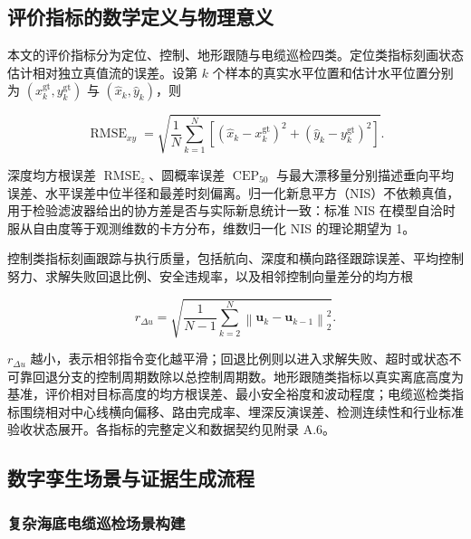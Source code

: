 \subsection{评价指标的数学定义与物理意义}\label{sec:ch05-5-1-4}

本文的评价指标分为定位、控制、地形跟随与电缆巡检四类。定位类指标刻画状态估计相对独立真值流的误差。设第 \(k\) 个样本的真实水平位置和估计水平位置分别为 \((x_k^{\mathrm{gt}},y_k^{\mathrm{gt}})\) 与 \((\hat{x}_k,\hat{y}_k)\)，则

\begin{equation}
\operatorname{RMSE}_{xy}
=
\sqrt{\frac{1}{N}
\sum_{k=1}^{N}
\left[
(\hat{x}_k-x_k^{\mathrm{gt}})^2
+
(\hat{y}_k-y_k^{\mathrm{gt}})^2
\right]}.
\label{eq:ch05-rmse-xy}
\end{equation}

深度均方根误差 \(\operatorname{RMSE}_z\)、圆概率误差 \(\operatorname{CEP}_{50}\) 与最大漂移量分别描述垂向平均误差、水平误差中位半径和最差时刻偏离。归一化新息平方（NIS）不依赖真值，用于检验滤波器给出的协方差是否与实际新息统计一致：标准 NIS 在模型自洽时服从自由度等于观测维数的卡方分布\cite{barshalom2001estimation}，维数归一化 NIS 的理论期望为 1。

控制类指标刻画跟踪与执行质量，包括航向、深度和横向路径跟踪误差、平均控制努力、求解失败回退比例、安全违规率，以及相邻控制向量差分的均方根

\begin{equation}
r_{\Delta u}
=
\sqrt{
\frac{1}{N-1}
\sum_{k=2}^{N}
\left\|
\boldsymbol{u}_k-\boldsymbol{u}_{k-1}
\right\|_2^2
}.
\label{eq:ch05-control-smoothness}
\end{equation}

\(r_{\Delta u}\) 越小，表示相邻指令变化越平滑；回退比例则以进入求解失败、超时或状态不可靠回退分支的控制周期数除以总控制周期数。地形跟随类指标以真实离底高度为基准，评价相对目标高度的均方根误差、最小安全裕度和波动程度；电缆巡检类指标围绕相对中心线横向偏移、路由完成率、埋深反演误差、检测连续性和行业标准验收状态展开。各指标的完整定义和数据契约见附录 A.6。

\subsection{数字孪生场景与证据生成流程}\label{sec:ch05-5-2}

\subsubsection{复杂海底电缆巡检场景构建}\label{sec:ch05-5-2-1}

